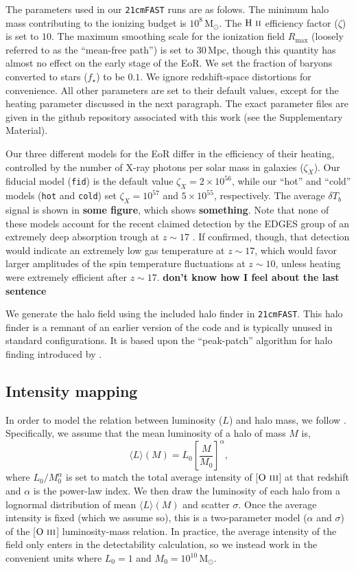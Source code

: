 \documentclass[a4paper,fleqn,usenatbib]{mnras}
\newcommand{\beq}{\begin{equation}}
\newcommand{\eeq}{\end{equation}}
\newcommand{\tfast}{\texttt{21cmFAST}}
\newcommand{\avg}[1]{\ensuremath{\langle #1 \rangle}}
\newcommand{\HII}{\ensuremath{\text{H~\textsc{ii}}}}
\newcommand{\OIII}{\ensuremath{\text{O~\textsc{iii}}}}
\newcommand{\Msun}{\ensuremath{\text{M}_\odot}}
\newcommand{\Mpc}{\ensuremath{\text{Mpc}}}
\newcommand{\fid}{\texttt{fid}}
\newcommand{\hot}{\texttt{hot}}
\newcommand{\cold}{\texttt{cold}}
\begin{document}
The parameters used in our \tfast{} runs are as folows. The minimum halo mass
contributing to the ionizing budget is $10^{8}\,\Msun$. The \HII{} efficiency
factor ($\zeta$) is set to $10$. The maximum smoothing scale for the
ionization field $R_{\text{max}}$ (loosely referred to as the ``mean-free
path'') is set to $30\,\Mpc$, though this quantity has almost no effect on the
early stage of the EoR. We set the fraction of baryons converted to stars
($f_\star$) to be $0.1$. We ignore redshift-space distortions for convenience.
All other parameters are set to their default values, except for the heating
parameter discussed in the next paragraph. The exact parameter files are given
in the github repository associated with this work (see the Supplementary
Material).

Our three different models for the EoR differ in the efficiency of their
heating, controlled by the number of X-ray photons per solar mass in galaxies
($\zeta_X$). Our fiducial model (\fid{}) is the default value
$\zeta_X=2\times10^{56}$, while our ``hot'' and ``cold'' models (\hot{} and
\cold{}) set $\zeta_X=10^{57}$ and $5\times10^{55}$, respectively. The average
$\delta T_b$ signal is shown in \textbf{some figure}, which shows
\textbf{something}. Note that none of these models account for the recent
claimed detection by the EDGES group of an extremely deep absorption trough at
$z\sim17$ \citep{2018Natur.555...67B}. If confirmed, though, that detection
would indicate an extremely low gas temperature at $z\sim17$, which would
favor larger amplitudes of the spin temperature fluctuations at $z\sim10$,
unless heating were extremely efficient after $z\sim17$. {\bf don't know how I
feel about the last sentence}

We generate the halo field using the included halo finder in \tfast{}. This
halo finder is a remnant of an earlier version of the code
\citep{2007ApJ...669..663M} and is typically unused in standard
configurations. It is based upon the ``peak-patch'' algorithm for halo finding
introduced by \citet{1996ApJS..103....1B}.

\subsection{Intensity mapping} \label{ssec:oiii_int_map}
In order to model the relation between luminosity ($L$) and
halo mass, we follow \citet{2019ApJ...874..133B}. Specifically, we assume that
the mean luminosity of a halo of mass $M$ is,
\beq \label{eq:lum_mass_relation}
\avg{L}(M) = L_0 \left[ \frac{M}{M_0} \right]^{\alpha}\text{,}
\eeq
where $L_0/M_0^{\alpha}$ is set to match the total average intensity of
[\OIII] at that redshift and $\alpha$ is the power-law index. We then draw the
luminosity of each halo from a lognormal distribution of mean $\avg{L}(M)$ and
scatter $\sigma$. Once the average intensity is fixed (which we assume so),
this is a two-parameter model ($\alpha$ and $\sigma$) of the [\OIII]
luminosity-mass relation. In practice, the average intensity of the field only
enters in the detectability calculation, so we instead work in the convenient
units where $L_0=1$ and $M_0=10^{10}\,\Msun$.
\end{document}

